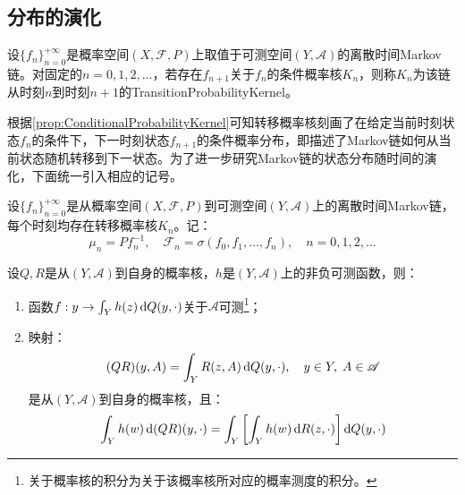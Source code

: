 \subsection{分布的演化}
\begin{definition}
	设$\{f_n\}_{n=0}^{+\infty}$是概率空间$(X,\mathscr{F},P)$上取值于可测空间$(Y,\mathscr{A})$的离散时间Markov链。对固定的$n=0,1,2,\dots$，若存在$f_{n+1}$关于$f_n$的条件概率核$K_n$，则称$K_n$为该链从时刻$n$到时刻$n+1$的\gls{TransitionProbabilityKernel}。
\end{definition}
根据\cref{prop:ConditionalProbabilityKernel}可知转移概率核刻画了在给定当前时刻状态$f_n$的条件下，下一时刻状态$f_{n+1}$的条件概率分布，即描述了Markov链如何从当前状态随机转移到下一状态。为了进一步研究Markov链的状态分布随时间的演化，下面统一引入相应的记号。\par
设$\{f_n\}_{n=0}^{+\infty}$是从概率空间$(X,\mathscr{F},P)$到可测空间$(Y,\mathscr{A})$上的离散时间Markov链，每个时刻均存在转移概率核$K_n$。记：
\begin{equation*}
	\mu_n=Pf_n^{-1},\quad\mathscr{F}_n=\sigma(f_0,f_1,\dots,f_n),\quad n=0,1,2,\dots
\end{equation*}
\begin{lemma}\label{lem:ProbabilityKernelIntegration}
	设$Q,R$是从$(Y,\mathscr{A})$到自身的概率核，$h$是$(Y,\mathscr{A})$上的非负可测函数，则：
	\begin{enumerate}
		\item 函数$f:y\to\int_{Y}h(z)\mathop{}\!\mathrm{d} Q(y,\cdot)$关于$\mathscr{A}$可测\footnote{关于概率核的积分为关于该概率核所对应的概率测度的积分。}；
		\item 映射：
		\begin{equation*}
			(QR)(y,A)=\int_{Y}R(z,A)\mathop{}\!\mathrm{d} Q(y,\cdot),\quad y\in Y,\;A\in\mathscr{A}
		\end{equation*}
		是从$(Y,\mathscr{A})$到自身的概率核，且：
		\begin{equation*}
			\int_{Y}h(w)\mathop{}\!\mathrm{d}(QR)(y,\cdot)=\int_{Y}\left[\int_{Y}h(w)\mathop{}\!\mathrm{d} R(z,\cdot)\right]\mathop{}\!\mathrm{d} Q(y,\cdot)
		\end{equation*}
	\end{enumerate}
\end{lemma}
